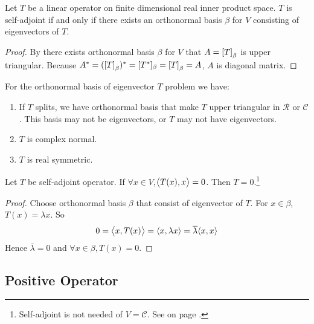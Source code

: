 \begin{theorem}\label{selfadjointmatrixhasorthonormalbasis}
    Let $T$ be a linear operator on finite dimensional real inner product space. $T$ is self-adjoint if and only if there exists an orthonormal basis $\beta$ for $V$ consisting of eigenvectors of $T$.    
\end{theorem}
\begin{proof}
    By  there exists orthonormal basis $\beta$ for $V$ that $A = \coordinate{T}_\beta$ is upper triangular. Because $A^* = (\coordinate{T}_\beta)^* = [T^*]_\beta = \coordinate{T}_\beta = A$, $A$ is diagonal matrix.
\end{proof}


\begin{theorem}
    For the orthonormal basis of eigenvector $T$ problem we have:
    \begin{enumerate}
        \item If $T$ splits, we have orthonormal basis that make $T$ upper triangular in $\mathcal{R}$ or $\mathcal{C}$. This basis may not be eigenvectors, or $T$ may not have eigenvectors.
        \item $T$ is complex normal.
        \item $T$ is real symmetric.
    \end{enumerate}
\end{theorem}


\begin{theorem}\label{zerotforalltxforselfadjoint}
    Let $T$ be self-adjoint operator. If $\forall x \in V$,$\innerproduct{T(x)}{x} = 0$. Then $T = 0$.\footnote{Self-adjoint is not needed of $V=\mathcal{C}$. See  on page \pageref{zerotforalltx}.}
\end{theorem}
\begin{proof}
    Choose orthonormal basis $\beta$ that consist of eigenvector of $T$. For $x\in \beta$, $T(x) =\lambda x$. So
    \begin{equation*}
        0 = \innerproduct{x}{T(x)} = \innerproduct{x}{\lambda x} = \overline{\lambda} \innerproduct{x}{x}
    \end{equation*}
    Hence $\overline{\lambda} = 0$ and $\forall x \in \beta,  T(x) = 0$.
\end{proof}


\subsection{Positive Operator}

